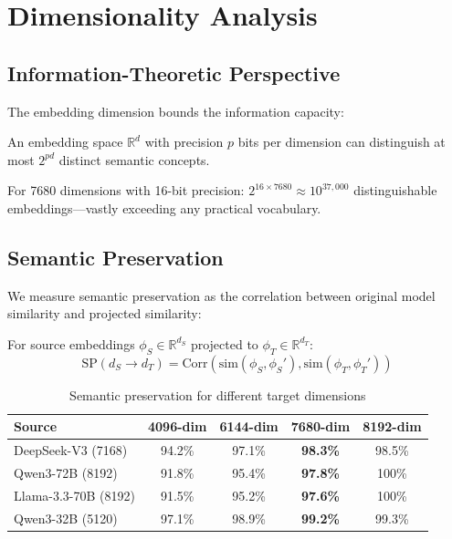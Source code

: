 \section{Dimensionality Analysis}

\label{sec:analysis}

\subsection{Information-Theoretic Perspective}

The embedding dimension bounds the information capacity:

\begin{theorem}
An embedding space $\mathbb{R}^d$ with precision $p$ bits per dimension can distinguish at most $2^{pd}$ distinct semantic concepts.
\end{theorem}

For 7680 dimensions with 16-bit precision: $2^{16 \times 7680} \approx 10^{37,000}$ distinguishable embeddings---vastly exceeding any practical vocabulary.

\subsection{Semantic Preservation}

We measure semantic preservation as the correlation between original model similarity and projected similarity:

\begin{definition}
For source embeddings $\phi_S \in \mathbb{R}^{d_S}$ projected to $\phi_T \in \mathbb{R}^{d_T}$:
\begin{equation}
\text{SP}(d_S \to d_T) = \text{Corr}\left(\text{sim}(\phi_S, \phi_S'), \text{sim}(\phi_T, \phi_T')\right)
\end{equation}
\end{definition}

\begin{table}[h]
\centering
\caption{Semantic preservation for different target dimensions}
\label{tab:preservation}
\begin{tabular}{lcccc}
\toprule
\textbf{Source} & \textbf{4096-dim} & \textbf{6144-dim} & \textbf{7680-dim} & \textbf{8192-dim} \\
\midrule
DeepSeek-V3 (7168) & 94.2\% & 97.1\% & \textbf{98.3\%} & 98.5\% \\
Qwen3-72B (8192) & 91.8\% & 95.4\% & \textbf{97.8\%} & 100\% \\
Llama-3.3-70B (8192) & 91.5\% & 95.2\% & \textbf{97.6\%} & 100\% \\
Qwen3-32B (5120) & 97.1\% & 98.9\% & \textbf{99.2\%} & 99.3\% \\
\bottomrule
\end{tabular}
\end{table}

